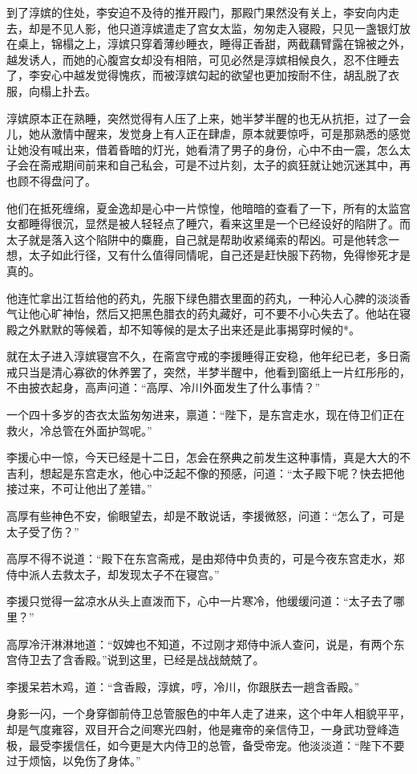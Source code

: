 到了淳嫔的住处，李安迫不及待的推开殿门，那殿门果然没有关上，李安向内走去，却是不见人影，他只道淳嫔遣走了宫女太监，匆匆走入寝殿，只见一盏银灯放在桌上，锦榻之上，淳嫔只穿着薄纱睡衣，睡得正香甜，两截藕臂露在锦被之外，越发诱人，而她的心腹宫女却没有相陪，可见必然是淳嫔相候良久，忍不住睡去了，李安心中越发觉得愧疚，而被淳嫔勾起的欲望也更加按耐不住，胡乱脱了衣服，向榻上扑去。

淳嫔原本正在熟睡，突然觉得有人压了上来，她半梦半醒的也无从抗拒，过了一会儿，她从激情中醒来，发觉身上有人正在肆虐，原本就要惊呼，可是那熟悉的感觉让她没有喊出来，借着昏暗的灯光，她看清了男子的身份，心中不由一震，怎么太子会在斋戒期间前来和自己私会，可是不过片刻，太子的疯狂就让她沉迷其中，再也顾不得盘问了。

他们在抵死缠绵，夏金逸却是心中一片惊惶，他暗暗的查看了一下，所有的太监宫女都睡得很沉，显然是被人轻轻点了睡穴，看来这里是一个已经设好的陷阱了。而太子就是落入这个陷阱中的麋鹿，自己就是帮助收紧绳索的帮凶。可是他转念一想，太子如此行径，又有什么值得同情呢，自己还是赶快服下药物，免得惨死才是真的。

他连忙拿出江哲给他的药丸，先服下绿色腊衣里面的药丸，一种沁人心脾的淡淡香气让他心旷神怡，然后又把黑色腊衣的药丸藏好，可不要不小心失去了。他站在寝殿之外默默的等候着，却不知等候的是太子出来还是此事揭穿时候的*。

就在太子进入淳嫔寝宫不久，在斋宫守戒的李援睡得正安稳，他年纪已老，多日斋戒只当是清心寡欲的休养罢了，突然，半梦半醒中，他看到窗纸上一片红彤彤的，不由披衣起身，高声问道：“高厚、冷川外面发生了什么事情？”

一个四十多岁的杏衣太监匆匆进来，禀道：“陛下，是东宫走水，现在侍卫们正在救火，冷总管在外面护驾呢。”

李援心中一惊，今天已经是十二日，怎会在祭典之前发生这种事情，真是大大的不吉利，想起是东宫走水，他心中泛起不像的预感，问道：“太子殿下呢？快去把他接过来，不可让他出了差错。”

高厚有些神色不安，偷眼望去，却是不敢说话，李援微怒，问道：“怎么了，可是太子受了伤？”

高厚不得不说道：“殿下在东宫斋戒，是由郑侍中负责的，可是今夜东宫走水，郑侍中派人去救太子，却发现太子不在寝宫。”

李援只觉得一盆凉水从头上直泼而下，心中一片寒冷，他缓缓问道：“太子去了哪里？”

高厚冷汗淋淋地道：“奴婢也不知道，不过刚才郑侍中派人查问，说是，有两个东宫侍卫去了含香殿。”说到这里，已经是战战兢兢了。

李援呆若木鸡，道：“含香殿，淳嫔，哼，冷川，你跟朕去一趟含香殿。”

身影一闪，一个身穿御前侍卫总管服色的中年人走了进来，这个中年人相貌平平，却是气度雍容，双目开合之间寒光四射，他是雍帝的亲信侍卫，一身武功登峰造极，最受李援信任，如今更是大内侍卫的总管，备受帝宠。他淡淡道：“陛下不要过于烦恼，以免伤了身体。”

